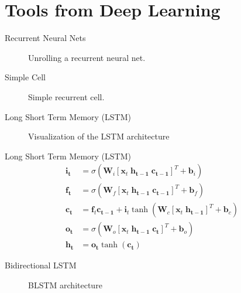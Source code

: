\documentclass{beamer}
\begin{document}
\section{Tools from Deep Learning}

\begin{frame}{Recurrent Neural Nets}
\begin{figure}
	
	\caption{Unrolling a recurrent neural net.}
\end{figure}
\end{frame}

\begin{frame}{Simple Cell}
	\begin{figure}
		
		\caption{Simple recurrent cell.}
	\end{figure}
\end{frame}



\begin{frame}{Long Short Term Memory (LSTM)}
	\begin{figure}
		
		\caption{Visualization of the LSTM architecture}
		\label{fig:lstm}
	\end{figure}
\end{frame}

\begin{frame}{Long Short Term Memory (LSTM)}
	\begin{align}
	\mathbf{i_t} &= \sigma (\mathbf{W}_i [\mathbf{x}_t \; \mathbf{h_{t-1}} \; \mathbf{c_{t-1}}]^T + \mathbf{b}_i) \\
	\mathbf{f_t} &= \sigma (\mathbf{W}_f [\mathbf{x}_t \; \mathbf{h_{t-1}} \; \mathbf{c_{t-1}}]^T + \mathbf{b}_f) \\
	\mathbf{c_t} &= \mathbf{f}_t \mathbf{c_{t-1}} + \mathbf{i}_t \tanh( \mathbf{W}_c [\mathbf{x}_t \; \mathbf{h_{t-1}}]^T + \mathbf{b}_c ) \\
	\mathbf{o_t} &= \sigma (\mathbf{W}_o [\mathbf{x}_t \; \mathbf{h_{t-1}} \; \mathbf{c_t}]^T + \mathbf{b}_o ) \\
	\mathbf{h_t} &= \mathbf{o_t} \tanh(\mathbf{c_t})
	\end{align}
\end{frame}

\begin{frame}{Bidirectional LSTM}
	\begin{figure}
		
		\caption{BLSTM architecture}
		\label{fig:blstm}
	\end{figure}
\end{frame}
\end{document}
